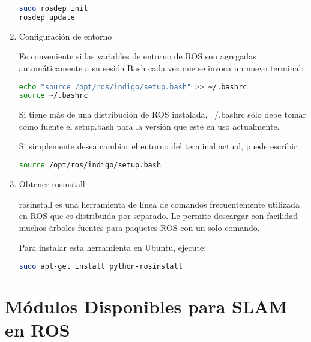 \begin{enumerate}
	\begin{blackcodebox}
	\begin{lstlisting}[language=bash]
sudo rosdep init
rosdep update
	\end{lstlisting}
	\end{blackcodebox}

	\item Configuración de entorno

	Es conveniente si las variables de entorno de ROS son agregadas automáticamente a su sesión Bash cada vez que se invoca un nuevo terminal:

	\begin{blackcodebox}
	\begin{lstlisting}[language=bash]
echo "source /opt/ros/indigo/setup.bash" >> ~/.bashrc
source ~/.bashrc
	\end{lstlisting}
	\end{blackcodebox}

	Si tiene más de una distribución de ROS instalada, ~/.bashrc sólo debe tomar como fuente el setup.bash para la versión que esté en uso actualmente.

	Si simplemente desea cambiar el entorno del terminal actual, puede escribir:

	\begin{blackcodebox}
	\begin{lstlisting}[language=bash]
source /opt/ros/indigo/setup.bash
	\end{lstlisting}
	\end{blackcodebox}

	\item Obtener rosinstall

rosinstall es una herramienta de línea de comandos frecuentemente utilizada en ROS que es distribuida por separado. Le permite descargar con facilidad muchos árboles fuentes para paquetes ROS con un solo comando.

Para instalar esta herramienta en Ubuntu, ejecute:

	\begin{blackcodebox}
	\begin{lstlisting}[language=bash]
sudo apt-get install python-rosinstall
	\end{lstlisting}
	\end{blackcodebox}
\end{enumerate}

\section{Módulos Disponibles para SLAM en ROS}

